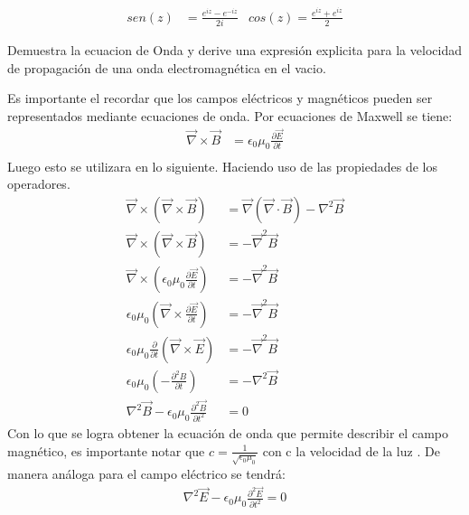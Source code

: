 \documentclass[
  11pt,
  letterpaper,
   addpoints,
   answers
  ]{exam}
\begin{document}
\begin{align}
    sen(z) &= \frac{e^{iz} - e^{-iz}}{2i} & cos(z) = \frac{e^{iz}+ e^{iz}}{2}
\end{align}
\begin{questions}
    \question  Demuestra la ecuacion de Onda y derive una expresión explicita para la velocidad de propagación de una onda electromagnética en el vacio.
    \begin{solution}
        Es importante el recordar que los campos eléctricos y magnéticos pueden ser representados mediante ecuaciones de onda. Por ecuaciones de Maxwell se tiene:
\begin{align}
     \Vec{\nabla} \times \Vec{B} &= \epsilon_{0}\mu_{0}\frac{\partial \Vec{E}}{\partial t}\\
\end{align}
Luego esto se utilizara en lo siguiente. Haciendo uso de las propiedades de los operadores.
\begin{align}
    \Vec{\nabla} \times ( \Vec{\nabla} \times \Vec{B}) &= \Vec{\nabla}(\Vec{\nabla} \cdot \Vec{B}) - \nabla^{2}\Vec{B}\\
    \Vec{\nabla} \times ( \Vec{\nabla} \times \Vec{B}) &= - \Vec{\nabla}^{2}\Vec{B}\\
    \Vec{\nabla} \times \left( \epsilon_{0}\mu_{0}\frac{\partial \Vec{E}}{\partial t}\right) &= -\Vec{\nabla}^{2} \Vec{B}\\
    \epsilon_{0} \mu_{0}\left( \Vec{\nabla} \times \frac{\partial \Vec{E}}{\partial t}\right) &= -\Vec{\nabla}^{2}\Vec{B}\\
    \epsilon_{0} \mu_{0} \frac{\partial }{\partial t}\left( \Vec{\nabla} \times \Vec{E} \right) &= -\Vec{\nabla}^{2}\Vec{B}\\
    \epsilon_{0}\mu_{0} \left( -\frac{\partial^{2}B}{\partial t}\right) &= -\nabla^{2}\Vec{B}\\
    \nabla^{2}\Vec{B} - \epsilon_{0}\mu_{0}\frac{\partial^{2}\Vec{B}}{\partial t^{2}}&=0
\end{align}
Con lo que se logra obtener la ecuación de onda que permite describir el campo magnético, es importante notar que $ c= \frac{1}{\sqrt{\epsilon_{0}\mu_{0}}}$ con c la velocidad de la luz . De manera análoga para el campo eléctrico se tendrá:
\begin{align}
    \nabla^{2}\Vec{E}  -\epsilon_{0}\mu_{0}\frac{\partial^{2} \Vec{E}}{\partial t^{2}} = 0
\end{align}
    \end{solution}

\end{questions}
\end{document}
